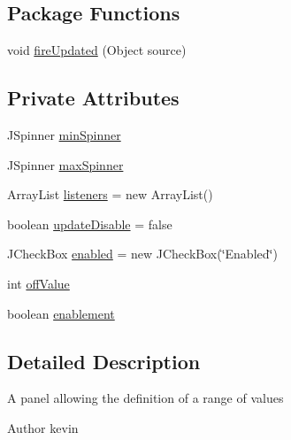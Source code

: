 \subsection*{Package Functions}
\begin{DoxyCompactItemize}
\item 
void \mbox{\hyperlink{classorg_1_1newdawn_1_1slick_1_1tools_1_1peditor_1_1_min_max_panel_a644b9b3a4aba513423b79140a87e362e}{fire\+Updated}} (Object source)
\end{DoxyCompactItemize}
\subsection*{Private Attributes}
\begin{DoxyCompactItemize}
\item 
J\+Spinner \mbox{\hyperlink{classorg_1_1newdawn_1_1slick_1_1tools_1_1peditor_1_1_min_max_panel_ae09b9ecc2a254d7a74044bb20b6b62e6}{min\+Spinner}}
\item 
J\+Spinner \mbox{\hyperlink{classorg_1_1newdawn_1_1slick_1_1tools_1_1peditor_1_1_min_max_panel_a9e445c1f2ecd3c64e93ec8bf69f639f9}{max\+Spinner}}
\item 
Array\+List \mbox{\hyperlink{classorg_1_1newdawn_1_1slick_1_1tools_1_1peditor_1_1_min_max_panel_a0ce6fcb8afb2d292f7e3ab80d2180179}{listeners}} = new Array\+List()
\item 
boolean \mbox{\hyperlink{classorg_1_1newdawn_1_1slick_1_1tools_1_1peditor_1_1_min_max_panel_a491e9fbca948ae878becef9e86e06b74}{update\+Disable}} = false
\item 
J\+Check\+Box \mbox{\hyperlink{classorg_1_1newdawn_1_1slick_1_1tools_1_1peditor_1_1_min_max_panel_aff685339c4d9c4cf8009bcfbf2bc72de}{enabled}} = new J\+Check\+Box(\char`\"{}Enabled\char`\"{})
\item 
int \mbox{\hyperlink{classorg_1_1newdawn_1_1slick_1_1tools_1_1peditor_1_1_min_max_panel_a5abd0ceb9a2307cef6de8fbade8039db}{off\+Value}}
\item 
boolean \mbox{\hyperlink{classorg_1_1newdawn_1_1slick_1_1tools_1_1peditor_1_1_min_max_panel_a82cdf912c2f081581d288b771c431703}{enablement}}
\end{DoxyCompactItemize}


\subsection{Detailed Description}
A panel allowing the definition of a range of values

\begin{DoxyAuthor}{Author}
kevin 
\end{DoxyAuthor}


